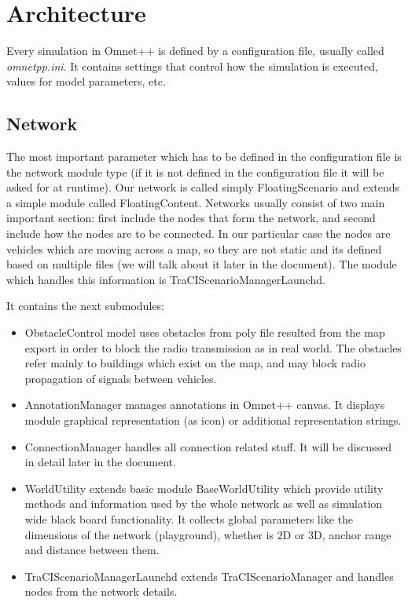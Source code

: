 \section{Architecture}
Every simulation in Omnet++ is defined by a configuration file, usually called
\mbox{\it omnetpp.ini}. It contains settings that control how the simulation is
executed, values for model parameters, etc.

\subsection{Network}
The most important parameter which has to be defined in the configuration file
is the network module type (if it is not defined in the configuration file it
will be asked for at runtime). Our network is called simply FloatingScenario and
extends a simple module called FloatingContent. Networks usually consist
of two main important section: first include the nodes that form the network,
and second include how the nodes are to be connected. In our particular case the
nodes are vehicles which are moving across a map, so they are not static and its
defined based on multiple files (we will talk about it later in the document).
The module which handles this information is TraCIScenarioManagerLaunchd.

It contains the next submodules:

\begin{itemize}
  \item ObstacleControl model uses obstacles from poly file resulted from the
  map export in order to block the radio transmission as in real world. The
  obstacles refer mainly to buildings which exist on the map, and may block
  radio propagation of signals between vehicles.
  \item AnnotationManager manages annotations in Omnet++ canvas. It displays
  module graphical representation (as icon) or additional representation
  strings.
  \item ConnectionManager handles all connection related stuff. It will be
  discussed in detail later in the document.
  \item WorldUtility extends basic module BaseWorldUtility which provide utility
  methods and information used by the whole network as well as simulation wide
  black board functionality. It collects global parameters like the dimensions
  of the network (playground), whether is 2D or 3D, anchor range and distance
  between them.
  \item TraCIScenarioManagerLaunchd extends TraCIScenarioManager and handles
  nodes from the network details.
\end{itemize}


